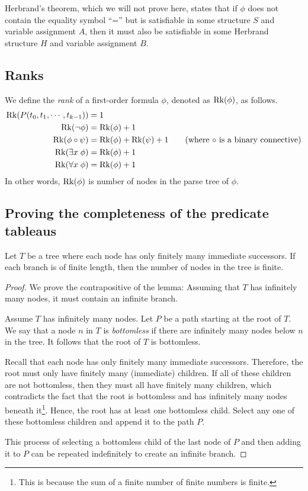 Herbrand's theorem, which we will not prove here, states that if \(\phi\) does not contain the equality symbol ``='' but is satisfiable in some structure \(S\) and variable assignment \(A\), then it must also be satisfiable in some Herbrand structure \(H\) and variable assignment \(B\).




\subsection{Ranks}

We define the \emph{rank} of a first-order formula \(\phi\), denoted as \(\operatorname{Rk}(\phi)\), as follows.
%
\begin{align*}
    \operatorname{Rk}(P(t_0, t_1, \cdots, t_{k-1})) &= 1\\
    \operatorname{Rk}(\neg\phi) &= \operatorname{Rk}(\phi) + 1\\
    \operatorname{Rk}(\phi\circ\psi) &= \operatorname{Rk}(\phi) + \operatorname{Rk}(\psi) + 1 \tag{where \(\circ\) is a binary connective}\\
    \operatorname{Rk}(\exists x\; \phi) &= \operatorname{Rk}(\phi) + 1\\
    \operatorname{Rk}(\forall x\; \phi) &= \operatorname{Rk}(\phi) + 1
\end{align*}
%
In other words, \(\operatorname{Rk}(\phi)\) is number of nodes in the parse tree of \(\phi\).


\subsection{Proving the completeness of the predicate tableaus}

\begin{lemma}
    Let \(T\) be a tree where each node has only finitely many immediate successors. If each branch is of finite length, then the number of nodes in the tree is finite.
\end{lemma}
\begin{proof}
    We prove the contrapositive of the lemma: Assuming that \(T\) has infinitely many nodes, it must contain an infinite branch.

    Assume \(T\) has infinitely many nodes. Let \(P\) be a path starting at the root of \(T\). We say that a node \(n\) in \(T\) is \emph{bottomless} if there are infinitely many nodes below \(n\) in the tree. It follows that the root of \(T\) is bottomless.

    Recall that each node has only finitely many immediate successors. Therefore, the root must only have finitely many (immediate) children. If all of these children are not bottomless, then they must all have finitely many children, which  contradicts the fact that the root is bottomless and has infinitely many nodes beneath it\footnote{This is because the sum of a finite number of finite numbers is finite.}. Hence, the root has at least one bottomless child. Select any one of these bottomless children and append it to the path \(P\).

    This process of selecting a bottomless child of the last node of \(P\) and then adding it to \(P\) can be repeated indefinitely to create an infinite branch.
\end{proof}




